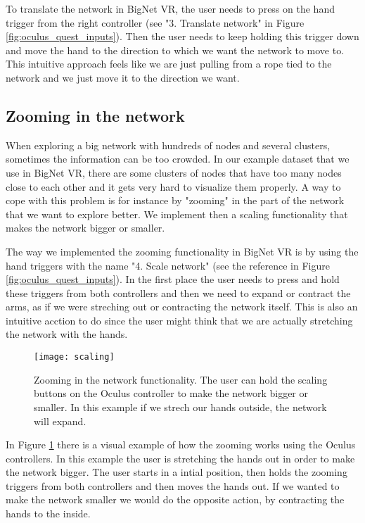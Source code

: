 To translate the network in BigNet VR, the user needs to press on the hand trigger from the right controller (see "3. Translate network" in Figure \ref{fig:oculus_quest_inputs}). Then the user needs to keep holding this trigger down and move the hand to the direction to which we want the network to move to. This intuitive approach feels like we are just pulling from a rope tied to the network and we just move it to the direction we want.


\subsection{Zooming in the network}
When exploring a big network with hundreds of nodes and several clusters, sometimes the information can be too crowded. In our example dataset that we use in BigNet VR, there are some clusters of nodes that have too many nodes close to each other and it gets very hard to visualize them properly. A way to cope with this problem is for instance by "zooming" in the part of the network that we want to explore better. We implement then a scaling functionality that makes the network bigger or smaller.

The way we implemented the zooming functionality in BigNet VR is by using the hand triggers with the name "4. Scale network" (see the reference in Figure \ref{fig:oculus_quest_inputs}). In the first place the user needs to press and hold these triggers from both controllers and then we need to expand or contract the arms, as if we were streching out or contracting the network itself. This is also an intuitive acction to do since the user might think that we are actually stretching the network with the hands.

\begin{figure}[h!]
    \centering%
    \texttt{[image: scaling]}
    \caption{Zooming in the network functionality. The user can hold the scaling buttons on the Oculus controller to make the network bigger or smaller. In this example if we strech our hands outside, the network will expand.}
    \label{fig:scaling}
\end{figure}%


In Figure \ref{fig:scaling} there is a visual example of how the zooming works using the Oculus controllers. In this example the user is stretching the hands out in order to make the network bigger. The user starts in a intial position, then holds the zooming triggers from both controllers and then moves the hands out. If we wanted to make the network smaller we would do the opposite action, by contracting the hands to the inside.

